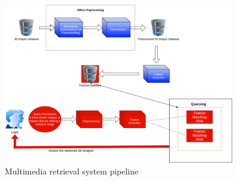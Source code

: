 \begin{figure}[H]
    \centering
    \includegraphics[width=0.9\textwidth]{assets/pipeline.png}
    \caption{Multimedia retrieval system pipeline}
    \label{fig:mr-pipeline}
\end{figure}

